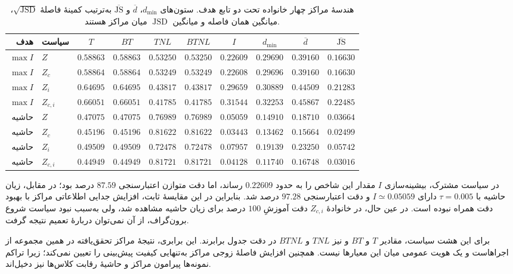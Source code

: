 \begin{table}[htbp]
\centering\begingroup\footnotesize\setlength{\tabcolsep}{4pt}
\caption{هندسهٔ مراکز چهار خانواده تحت دو تابع هدف. ستون‌های $d_{\min}$، $\overline d$ و $\overline{\mathrm{JS}}$ به‌ترتیب کمینهٔ فاصلهٔ $\sqrt{\operatorname{JSD}}$، میانگین همان فاصله و میانگین $\operatorname{JSD}$ میان مراکز هستند.}
\label{tab:ch4-v1-center-geometry}
\begin{tabular}{rlcccccccc}\hline
هدف & سیاست & $T$ & $BT$ & $TNL$ & $BTNL$ & $I$ & $d_{\min}$ & $\overline d$ & $\overline{\mathrm{JS}}$\\\hline
$\max I$ & $Z$ & $0.58863$ & $0.58863$ & $0.53250$ & $0.53250$ & $0.22609$ & $0.29690$ & $0.39160$ & $0.16630$\\
$\max I$ & $Z_c$ & $0.58864$ & $0.58864$ & $0.53249$ & $0.53249$ & $0.22608$ & $0.29696$ & $0.39160$ & $0.16630$\\
$\max I$ & $Z_i$ & $0.64695$ & $0.64695$ & $0.43817$ & $0.43817$ & $0.29659$ & $0.30889$ & $0.44509$ & $0.21283$\\
$\max I$ & $Z_{c,i}$ & $0.66051$ & $0.66051$ & $0.41785$ & $0.41785$ & $0.31544$ & $0.32253$ & $0.45867$ & $0.22485$\\
حاشیه & $Z$ & $0.47075$ & $0.47075$ & $0.76989$ & $0.76989$ & $0.05059$ & $0.14910$ & $0.18710$ & $0.03664$\\
حاشیه & $Z_c$ & $0.45196$ & $0.45196$ & $0.81622$ & $0.81622$ & $0.03443$ & $0.13462$ & $0.15664$ & $0.02499$\\
حاشیه & $Z_i$ & $0.49509$ & $0.49509$ & $0.72478$ & $0.72478$ & $0.07957$ & $0.19139$ & $0.23250$ & $0.05742$\\
حاشیه & $Z_{c,i}$ & $0.44949$ & $0.44949$ & $0.81721$ & $0.81721$ & $0.04128$ & $0.11740$ & $0.16748$ & $0.03016$\\
\hline
\end{tabular}
\endgroup\end{table}

در سیاست مشترک، بیشینه‌سازی $I$ مقدار این شاخص را به حدود $0.22609$ رساند، اما دقت متوازن اعتبارسنجی $87.59$ درصد بود؛ در مقابل، زیان حاشیه با $\tau=0.005$ دارای $I\simeq0.05059$ و دقت اعتبارسنجی $97.28$ درصد شد. بنابراین در این مقایسهٔ ثابت، افزایش جدایی اطلاعاتی مراکز با بهبود دقت همراه نبوده است. در عین حال، در خانوادهٔ $Z_{c,i}$ دقت آموزشِ $100$ درصد برای زیان حاشیه مشاهده شد، ولی به‌سبب نبود سیاست شروع برون‌گراف، از آن نمی‌توان دربارهٔ تعمیم نتیجه گرفت.

برای این هشت سیاست، مقادیر $T$ و $BT$ و نیز $TNL$ و $BTNL$ در دقت جدول برابرند. این برابری، نتیجهٔ مراکز تحقق‌یافته در همین مجموعه از اجراهاست و یک هویت عمومی میان این معیارها نیست. همچنین افزایش فاصلهٔ زوجی مراکز به‌تنهایی کیفیت پیش‌بینی را تعیین نمی‌کند؛ زیرا تراکم نمونه‌ها پیرامون مراکز و حاشیهٔ رقابت کلاس‌ها نیز دخیل‌اند.

